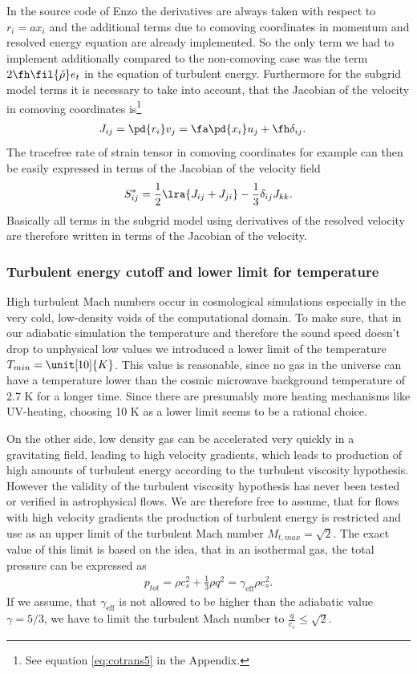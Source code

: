 In the source code of Enzo the derivatives are always taken with respect
to $r_i=a x_i$ and the additional terms due to comoving coordinates in 
momentum and resolved energy equation are already implemented. So the only term
we had to implement additionally compared to the non-comoving case was the term
$2\fh\fil {\tilde{\rho}}e_t$ in the equation of turbulent energy. Furthermore
for the subgrid model terms it is necessary to take into account, that
the Jacobian of the velocity in comoving coordinates is\footnote{See equation
\eqref{eq:cotrans5} in the Appendix.}
\begin{align}
J_{ij} = \pd{r_i}v_j&=\fa\pd{x_i}u_j + \fh\delta_{ij}.
\end{align}
The tracefree rate of strain tensor in comoving coordinates for example can then
be easily expressed in terms of the Jacobian of the velocity field
\begin{align}
S^*_{ij}=\frac{1}{2}\lra{J_{ij}+J_{ji}}-\frac{1}{3}\delta_{ij}J_{kk}.
\end{align}
Basically all terms in the subgrid model using derivatives of the resolved
velocity are therefore written in terms of the Jacobian of the velocity.

\subsubsection{Turbulent energy cutoff and lower limit for temperature}
High turbulent Mach numbers occur in cosmological simulations especially in the
very cold, low-density voids of the computational domain. To make sure, that in
our adiabatic simulation the temperature and therefore the sound speed doesn't
drop to unphysical low values we introduced a lower limit of the temperature
$T_{min}=\unit[10]{K}$. This value is reasonable, since no gas in the
universe can have a temperature lower than the cosmic microwave background
temperature of 2.7 K for a longer time. Since there are presumably more
heating mechanisms like UV-heating, choosing 10 K as a lower limit seems to be
a rational choice. 

On the other side, low density gas can be accelerated very quickly in a
gravitating field, leading to high velocity gradients, which leads to 
production of high amounts of turbulent energy according to the turbulent
viscosity hypothesis. However the validity of the turbulent viscosity
hypothesis has never been tested or verified in astrophysical
flows. We are therefore free to assume, that for flows with high velocity
gradients the production of turbulent energy is restricted and use as an
upper limit of the turbulent Mach number $M_{t,max}=\sqrt{2}$. The exact value
of this limit is based on the idea, that in an isothermal gas, the total
pressure can be expressed as
\begin{align}
p_{tot}=\rho c_s^2 + \frac{1}{3}\rho q^2 = \gamma_{\text{eff}} \rho c_s^2.
\end{align}
If we assume, that $\gamma_{\text{eff}}$ is not allowed to be higher than the
adiabatic value $\gamma=5/3$, we have to limit the turbulent Mach number to
$\frac{q}{c_s} \leq \sqrt{2}$.  

